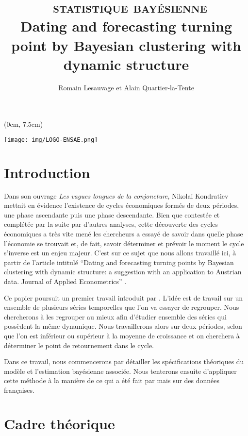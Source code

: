 \documentclass[10pt,french,french]{article}
\title{~\textsc{statistique bayésienne}\\
\hspace*{0.333em}Dating and forecasting turning point by Bayesian clustering with dynamic structure}
\author{Romain Lesauvage et Alain Quartier-la-Tente}
\date{}
\begin{document}
\maketitle


\begin{textblock*}{\textwidth}(0cm,-7.5cm)
\begin{center}
\texttt{[image: img/LOGO-ENSAE.png]}
\end{center}
\end{textblock*}

\hypertarget{introduction}{%
\section{Introduction}\label{introduction}}

Dans son ouvrage \emph{Les vagues longues de la conjoncture}, Nikolai Kondratiev mettait en évidence l'existence de cycles économiques formés de deux périodes, une phase ascendante puis une phase descendante.
Bien que contestée et complétée par la suite par d'autres analyses, cette découverte des cycles économiques a très vite mené les chercheurs a essayé de savoir dans quelle phase l'économie se trouvait et, de fait, savoir déterminer et prévoir le moment le cycle s'inverse est un enjeu majeur.
C'est sur ce sujet que nous allons travaillé ici, à partir de l'article intitulé ``Dating and forecasting turning points by Bayesian clustering with dynamic structure: a suggestion with an application to Austrian data. Journal of Applied Econometrics'' \cite{Kaufmann}.

Ce papier poursuit un premier travail introduit par \cite{FruhwirthKaufmann}.
L'idée est de travail sur un ensemble de plusieurs séries temporelles que l'on va essayer de regrouper.
Nous chercherons à les regrouper au mieux afin d'étudier ensemble des séries qui possèdent la même dynamique.
Nous travaillerons alors sur deux périodes, selon que l'on est inférieur ou supérieur à la moyenne de croissance et on cherchera à déterminer le point de retournement dans le cycle.

Dans ce travail, nous commencerons par détailler les spécifications théoriques du modèle et l'estimation bayésienne associée.
Nous tenterons ensuite d'appliquer cette méthode à la manière de ce qui a été fait par \cite{Kaufmann} mais sur des données françaises.

\hypertarget{cadre-thuxe9orique}{%
\section{Cadre théorique}\label{cadre-thuxe9orique}}
\end{document}
